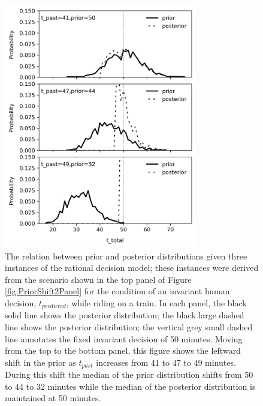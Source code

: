 \documentclass[a4paper,man,natbib]{apa6}
\begin{document}
\begin{figure}
    \centering
    \includegraphics[width=0.75\textwidth]{Figures/Theory_PriorShift_1.png}
    \caption{The relation between prior and posterior distributions given three instances of the rational decision model; these instances were derived from the scenario shown in the top panel of Figure \ref{fig:PriorShift2Panel} for the condition of an invariant human decision, $t_{predicted}$, while riding on a train.  In each panel, the black solid line shows the posterior distribution; the black large dashed line shows the posterior distribution; the vertical grey small dashed line annotates the fixed invariant decision of 50 minutes.  Moving from the top to the bottom panel, this figure shows the leftward shift in the prior as $t_{past}$ increases from 41 to 47 to 49 minutes.  During this shift the median of the prior distribution shifts from 50 to 44 to 32 minutes while the median of the posterior distribution is maintained at 50 minutes.
    }
    \label{fig:PriorShift1}
\end{figure}

\end{document}
